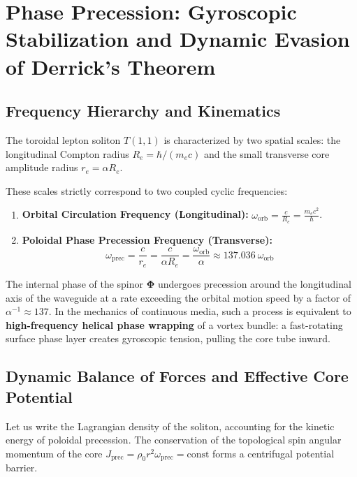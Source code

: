 \documentclass[12pt,a4paper]{article}
\begin{document}
	\section{Phase Precession: Gyroscopic Stabilization and Dynamic Evasion of Derrick's Theorem}
	
	\subsection{Frequency Hierarchy and Kinematics}
	The toroidal lepton soliton $T(1,1)$ is characterized by two spatial scales: the longitudinal Compton radius $R_e = \hbar / (m_e c)$ and the small transverse core amplitude radius $r_e = \alpha R_e$.
	
	These scales strictly correspond to two coupled cyclic frequencies:
	\begin{enumerate}
		\item \textbf{Orbital Circulation Frequency (Longitudinal):} $\omega_{\text{orb}} = \frac{c}{R_e} = \frac{m_e c^2}{\hbar}$.
		\item \textbf{Poloidal Phase Precession Frequency (Transverse):} 
		\begin{equation}
			\omega_{\text{prec}} = \frac{c}{r_e} = \frac{c}{\alpha R_e} = \frac{\omega_{\text{orb}}}{\alpha} \approx 137.036 \ \omega_{\text{orb}}
		\end{equation}
	\end{enumerate}
	
	The internal phase of the spinor $\boldsymbol{\Phi}$ undergoes precession around the longitudinal axis of the waveguide at a rate exceeding the orbital motion speed by a factor of $\alpha^{-1} \approx 137$. 
	In the mechanics of continuous media, such a process is equivalent to \textbf{high-frequency helical phase wrapping} of a vortex bundle: a fast-rotating surface phase layer creates gyroscopic tension, pulling the core tube inward.
	
	\subsection{Dynamic Balance of Forces and Effective Core Potential}
	Let us write the Lagrangian density of the soliton, accounting for the kinetic energy of poloidal precession. The conservation of the topological spin angular momentum of the core $J_{\text{prec}} = \rho_0 r^2 \omega_{\text{prec}} = \text{const}$ forms a centrifugal potential barrier.
	
\end{document}
